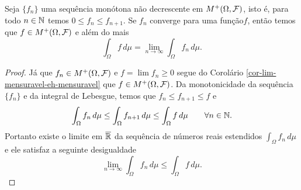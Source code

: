 \begin{teorema}
\label{Teo-Convergencia-Monótona}
Seja $\{f_n\}$ uma sequência monótona
não decrescente em 
$M^{+}(\Omega,\mathcal{F})$, isto é, 
para todo $n\in\mathbb{N}$ temos $0\leq f_n\leq f_{n+1}$.
Se $f_n$ converge para uma função$f$,
então temos que  $f\in M^{+}(\Omega,\mathcal{F})$ e
além do mais
	\[
	\int_{\Omega} f\, d\mu 
	=
	\lim_{n\to\infty}\int_{\Omega} f_n\, d\mu.
	\]
\end{teorema}



\begin{proof}
Já que $f_n\in M^{+}(\Omega,\mathcal{F})$ e $f=\lim f_n\geq 0$
segue do Corolário \ref{cor-lim-mensuravel-eh-mensuravel} 
que $f\in M^{+}(\Omega,\mathcal{F})$.
Da monotonicidade da sequência $\{f_n\}$ e da 
integral de Lebesgue, temos que 
$f_n\leq f_{n+1}\leq f$ e 
	\[
		\int_{\Omega} f_n\, d\mu 
		\leq
		\int_{\Omega} f_{n+1}\, d\mu
		\leq 
		\int_{\Omega} f\, d\mu
		\qquad
		\forall n\in\mathbb{N}.
	\] 
Portanto existe o limite em $\overline{\mathbb{R}}$ da
sequência de números reais estendidos $\int_{\Omega}f_n\, d\mu$ 
e ele satisfaz a seguinte desigualdade
	\begin{equation}\label{des-aux1-TCM}
		\lim_{n\to\infty} \int_{\Omega} f_n\, d\mu 
		\leq
		\int_{\Omega} f\, d\mu. 
	\end{equation}



\end{proof}
